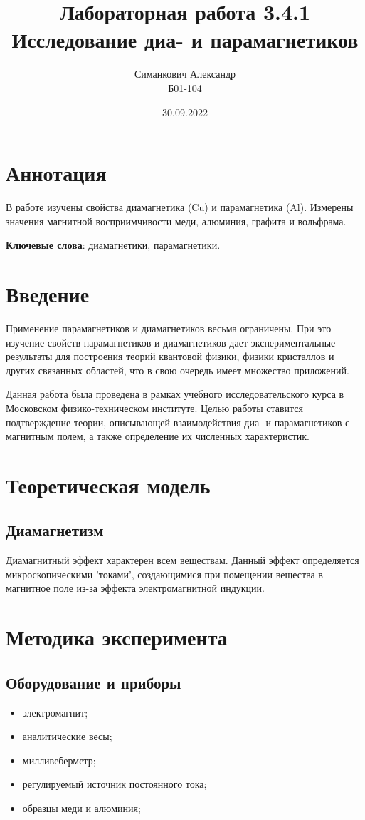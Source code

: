 \documentclass[12pt,a4paper]{article}
\title{Лабораторная работа 3.4.1\\ Исследование диа- и парамагнетиков}
\author{Симанкович Александр \\ Б01-104}
\date{30.09.2022}
\begin{document}
	\maketitle
	
	\section*{Аннотация}
	
	В работе изучены свойства диамагнетика (Cu) и парамагнетика (Al). Измерены значения магнитной восприимчивости меди, алюминия, графита и вольфрама.
	
	\vspace{10pt}
	\noindent\textbf{Ключевые слова}: диамагнетики, парамагнетики.
	
	\section*{Введение}
		
	Применение парамагнетиков и диамагнетиков весьма ограничены. При это изучение свойств парамагнетиков и диамагнетиков дает экспериментальные результаты для построения теорий квантовой физики, физики кристаллов и других связанных областей, что в свою очередь имеет множество приложений.
	
	Данная работа была проведена в рамках учебного исследовательского курса в Московском физико-техническом институте. Целью работы ставится подтверждение теории, описывающей взаимодействия диа- и парамагнетиков с магнитным полем, а также определение их численных характеристик.
	
	\section*{Теоретическая модель}
	
	\subsection*{Диамагнетизм}
	
	Диамагнитный эффект характерен всем веществам. Данный эффект определяется микроскопическими 'токами', создающимися при помещении вещества в магнитное поле из-за эффекта электромагнитной индукции.
	
	\section*{Методика эксперимента}
	
	\subsection*{Оборудование и приборы}
	\begin{itemize}[itemsep = 0pt, parsep=0pt]
		\item электромагнит;
		\item аналитические весы;
		\item милливеберметр;
		\item регулируемый источник постоянного тока;
		\item образцы меди и алюминия;
	\end{itemize}
	
\end{document}
